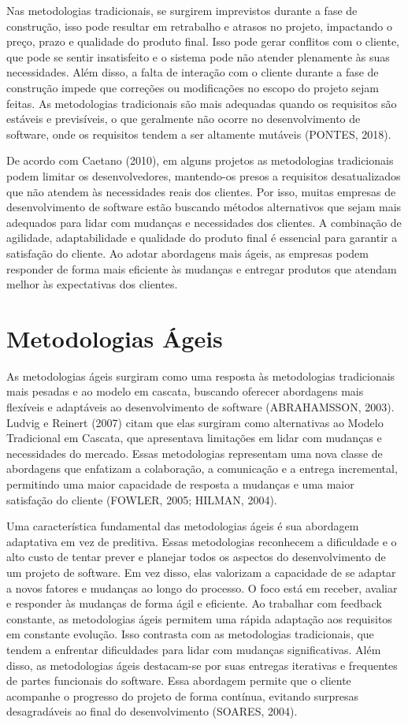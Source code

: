 Nas metodologias tradicionais, se surgirem imprevistos durante a fase de construção, isso pode resultar em retrabalho e atrasos no projeto, impactando o preço, prazo e qualidade do produto final. Isso pode gerar conflitos com o cliente, que pode se sentir insatisfeito e o sistema pode não atender plenamente às suas necessidades. Além disso, a falta de interação com o cliente durante a fase de construção impede que correções ou modificações no escopo do projeto sejam feitas. As metodologias tradicionais são mais adequadas quando os requisitos são estáveis e previsíveis, o que geralmente não ocorre no desenvolvimento de software, onde os requisitos tendem a ser altamente mutáveis (PONTES, 2018).

De acordo com Caetano (2010), em alguns projetos as metodologias tradicionais podem limitar os desenvolvedores, mantendo-os presos a requisitos desatualizados que não atendem às necessidades reais dos clientes. Por isso, muitas empresas de desenvolvimento de software estão buscando métodos alternativos que sejam mais adequados para lidar com mudanças e necessidades dos clientes. A combinação de agilidade, adaptabilidade e qualidade do produto final é essencial para garantir a satisfação do cliente. Ao adotar abordagens mais ágeis, as empresas podem responder de forma mais eficiente às mudanças e entregar produtos que atendam melhor às expectativas dos clientes.

\section{Metodologias Ágeis}
As metodologias ágeis surgiram como uma resposta às metodologias tradicionais mais pesadas e ao modelo em cascata, buscando oferecer abordagens mais flexíveis e adaptáveis ao desenvolvimento de software (ABRAHAMSSON, 2003). Ludvig e Reinert (2007) citam que elas surgiram como alternativas ao Modelo Tradicional em Cascata, que apresentava limitações em lidar com mudanças e necessidades do mercado. Essas metodologias representam uma nova classe de abordagens que enfatizam a colaboração, a comunicação e a entrega incremental, permitindo uma maior capacidade de resposta a mudanças e uma maior satisfação do cliente (FOWLER, 2005; HILMAN, 2004).

Uma característica fundamental das metodologias ágeis é sua abordagem adaptativa em vez de preditiva. Essas metodologias reconhecem a dificuldade e o alto custo de tentar prever e planejar todos os aspectos do desenvolvimento de um projeto de software. Em vez disso, elas valorizam a capacidade de se adaptar a novos fatores e mudanças ao longo do processo. O foco está em receber, avaliar e responder às mudanças de forma ágil e eficiente. Ao trabalhar com feedback constante, as metodologias ágeis permitem uma rápida adaptação aos requisitos em constante evolução. Isso contrasta com as metodologias tradicionais, que tendem a enfrentar dificuldades para lidar com mudanças significativas. Além disso, as metodologias ágeis destacam-se por suas entregas iterativas e frequentes de partes funcionais do software. Essa abordagem permite que o cliente acompanhe o progresso do projeto de forma contínua, evitando surpresas desagradáveis ao final do desenvolvimento (SOARES, 2004).

